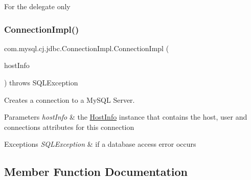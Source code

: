 \textquotesingle{} For the delegate only \mbox{\label{classcom_1_1mysql_1_1cj_1_1jdbc_1_1_connection_impl_a821f9640583d1b2daea0424f3b0ea945}} 
\subsubsection{\texorpdfstring{Connection\+Impl()}{ConnectionImpl()}\hspace{0.1cm}{\footnotesize\ttfamily [2/2]}}
{\footnotesize\ttfamily com.\+mysql.\+cj.\+jdbc.\+Connection\+Impl.\+Connection\+Impl (\begin{DoxyParamCaption}\item[{\mbox{\hyperlink{classcom_1_1mysql_1_1cj_1_1conf_1_1_host_info}{Host\+Info}}}]{host\+Info }\end{DoxyParamCaption}) throws S\+Q\+L\+Exception}

Creates a connection to a My\+S\+QL Server.


\begin{DoxyParams}{Parameters}
{\em host\+Info} & the \mbox{\hyperlink{}{Host\+Info}} instance that contains the host, user and connections attributes for this connection \\
\hline
\end{DoxyParams}

\begin{DoxyExceptions}{Exceptions}
{\em S\+Q\+L\+Exception} & if a database access error occurs \\
\hline
\end{DoxyExceptions}


\subsection{Member Function Documentation}
\mbox{\label{classcom_1_1mysql_1_1cj_1_1jdbc_1_1_connection_impl_a97fc7b6202c905eca353b5d307a9a04d}} 
